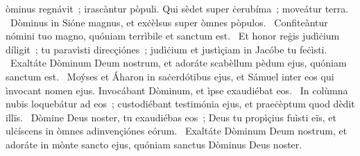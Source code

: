 { }
{%
òminus regnávit~; irascàntur pòpuli. Qui sèdet super ċerubíma~; moveátur terra. 
~Dòminus in Sióne magnus, et exċèlsus super òmnes pòpulos. 
~Confiteàntur nómini tuo magno, quóniam terrìbile et sanctum est. 
~Et honor reġis judìċium díligit~; tu paravìsti direcçiónes~; judìċium et justìçiam in Jacóbe tu feċìsti. 
~Exaltáte Dòminum Deum nostrum, et adoráte scabèllum pèdum ejus, quóniam sanctum est. 
~Moýses et Áharon in saċerdótibus ejus, et Sámuel inter eos qui ìnvocant nomen ejus. Invocábant Dòminum, et ìpse exaudiébat eos. 
~In colùmna nubis loquebátur ad eos~; custodiébant testimónia ejus, et praeċèptum quod dèdit illïs. 
~Dòmine Deus noster, tu exaudiébas eos~; Deus tu propìçius fuìsti eïs, et ulċíscens in òmnes adinvençiónes eórum. 
~Exaltáte Dòminum Deum nostrum, et adoráte in mònte sancto ejus, quóniam sanctus Dòminus Deus noster. 
}
